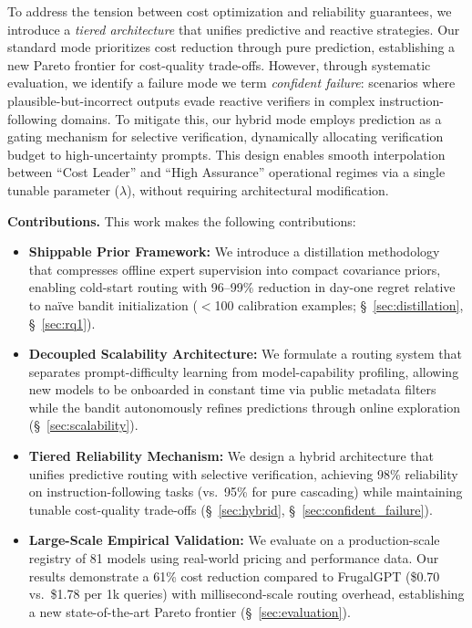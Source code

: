 To address the tension between cost optimization and reliability guarantees, we introduce a \emph{tiered architecture} that unifies predictive and reactive strategies. Our standard mode prioritizes cost reduction through pure prediction, establishing a new Pareto frontier for cost-quality trade-offs. However, through systematic evaluation, we identify a failure mode we term \emph{confident failure}: scenarios where plausible-but-incorrect outputs evade reactive verifiers in complex instruction-following domains. To mitigate this, our hybrid mode employs prediction as a gating mechanism for selective verification, dynamically allocating verification budget to high-uncertainty prompts. This design enables smooth interpolation between ``Cost Leader'' and ``High Assurance'' operational regimes via a single tunable parameter ($\lambda$), without requiring architectural modification.

\smallskip
\noindent\textbf{Contributions.} This work makes the following contributions:
\begin{itemize}[leftmargin=*]
    \item \textbf{Shippable Prior Framework:} We introduce a distillation methodology that compresses offline expert supervision into compact covariance priors, enabling cold-start routing with 96--99\% reduction in day-one regret relative to na\"ive bandit initialization ($<$100 calibration examples; \S~\ref{sec:distillation}, \S~\ref{sec:rq1}).
    \item \textbf{Decoupled Scalability Architecture:} We formulate a routing system that separates prompt-difficulty learning from model-capability profiling, allowing new models to be onboarded in constant time via public metadata filters while the bandit autonomously refines predictions through online exploration (\S~\ref{sec:scalability}).
    \item \textbf{Tiered Reliability Mechanism:} We design a hybrid architecture that unifies predictive routing with selective verification, achieving 98\% reliability on instruction-following tasks (vs.\ 95\% for pure cascading) while maintaining tunable cost-quality trade-offs (\S~\ref{sec:hybrid}, \S~\ref{sec:confident_failure}).
    \item \textbf{Large-Scale Empirical Validation:} We evaluate \ours{} on a production-scale registry of 81 models using real-world pricing and performance data. Our results demonstrate a 61\% cost reduction compared to FrugalGPT (\$0.70 vs.\ \$1.78 per 1k queries) with millisecond-scale routing overhead, establishing a new state-of-the-art Pareto frontier (\S~\ref{sec:evaluation}).
\end{itemize}
